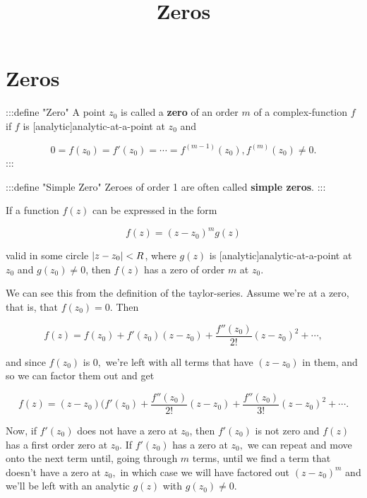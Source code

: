 \documentclass{article}
\title{Zeros}
\begin{document}
\section{Zeros}

:::define "Zero"
A point $z_0$ is called a \textbf{zero} of an order $m$ of a \@{complex-function} $f$ if $f$ is \@[analytic]{analytic-at-a-point} at $z_0$ and

\[ 0 = f(z_0) = f'(z_0) = \cdots = f^{(m-1)}(z_0), f^{(m)}(z_0) \neq 0. \]
:::

:::define "Simple Zero"
Zeroes of order 1 are often called \textbf{simple zeros}.
:::

\begin{theorem}
If a function $f(z)$ can be expressed in the form

\[ f(z) = (z - z_0)^m g(z) \]

valid in some circle $\left| z - z_0 \right| < R$, where $g(z)$ is \@[analytic]{analytic-at-a-point} at $z_0$ and $g(z_0) \neq 0$, then $f(z)$ has a zero of order $m$ at $z_0$.
\end{theorem}

\begin{intuition}
We can see this from the definition of the \@{taylor-series}. Assume we're at a zero, that is, that $f(z_0) = 0.$ Then

\[ f(z) = f(z_0) + f'(z_0)(z - z_0) + \frac{f''(z_0)}{2!}(z - z_0)^2 + \cdots, \]

and since $f(z_0)$ is $0,$ we're left with all terms that have $(z - z_0)$ in them, and so we can factor them out and get

\[ f(z) = (z - z_0)(f'(z_0) + \frac{f''(z_0)}{2!}(z - z_0) + \frac{f''(z_0)}{3!}(z - z_0)^2 + \cdots. \]

Now, if $f'(z_0)$ does not have a zero at $z_0$, then $f'(z_0)$ is not zero and $f(z)$ has a first order zero at $z_0.$ If $f'(z_0)$ has a zero at $z_0,$ we can repeat and move onto the next term until, going through $m$ terms, until we find a term that doesn't have a zero at $z_0,$ in which case we will have factored out $(z - z_0)^m$ and we'll be left with an \@{analytic} $g(z)$ with $g(z_0) \neq 0.$
\end{intuition}
\end{document}
